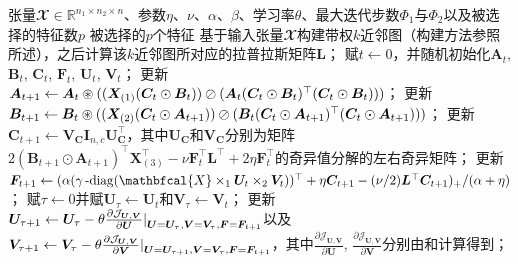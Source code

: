 \begin{algorithm}[t]
    \begin{algorithmic}[1]
    \REQUIRE 张量$\mathbfcal{X}\in \mathbb{R}^{n_{1}\times n_{2}\times n}$、参数$\eta$、$\nu$、$\alpha$、$\beta$、学习率$\theta$、最大迭代步数$\Phi_1$与$\Phi_2$以及被选择的特征数$p$
    \ENSURE 被选择的$p$个特征
    \STATE 基于输入张量$\mathbfcal{X}$构建带权$k$近邻图（构建方法参照所述），之后计算该$k$近邻图所对应的拉普拉斯矩阵$\boldsymbol{L}$；
    \STATE 赋$t\leftarrow0$，并随机初始化$\boldsymbol{A}_{t}$, $\boldsymbol{B}_{t}$, $\boldsymbol{C}_{t}$, $\boldsymbol{F}_{t}$, $\boldsymbol{U}_{t}$, $\boldsymbol{V}_{t}$；
    \STATE 更新$\boldsymbol{A}_{t+1}\leftarrow\boldsymbol{A}_{t}\oast((\boldsymbol{X}_{(1)}(\boldsymbol{C}_{t}\odot\boldsymbol{B}_{t}))\oslash(\boldsymbol{A}_{t}(\boldsymbol{C}_{t}\odot\boldsymbol{B}_{t})^{\top}(\boldsymbol{C}_{t}\odot\boldsymbol{B}_{t})))$；
    \STATE 更新$\boldsymbol{B}_{t+1}\leftarrow\boldsymbol{B}_{t}\oast((\boldsymbol{X}_{(2)}(\boldsymbol{C}_{t}\odot\boldsymbol{A}_{t+1}))\oslash(\boldsymbol{B}_{t}(\boldsymbol{C}_{t}\odot\boldsymbol{A}_{t+1})^{\top}(\boldsymbol{C}_{t}\odot\boldsymbol{A}_{t+1})))$；
    \STATE 更新$\boldsymbol{C}_{t+1} \leftarrow \boldsymbol{V}_{\boldsymbol{C}}\boldsymbol{I}_{n,c}\boldsymbol{U}_{\boldsymbol{C}}^{\top}$，其中$\boldsymbol{U}_{\boldsymbol{C}}$和$\boldsymbol{V}_{\boldsymbol{C}}$分别为矩阵$2(\boldsymbol{B}_{t+1}\odot\boldsymbol{A}_{t+1})^{\top}\allowbreak\boldsymbol{X}_{(3)}^{\top}-\nu\boldsymbol{F}_{t}^{\top}\boldsymbol{L}^{\top} + 2\eta\boldsymbol{F}_{t}^{\top}$的奇异值分解的左右奇异矩阵；
    \STATE 更新$\boldsymbol{F}_{t+1}\leftarrow(\alpha(\mydiag(\mathbfcal{X}\times_{1}\boldsymbol{U}_{t}\times_{2}\boldsymbol{V}_{t}))^{\top}+\eta\boldsymbol{C}_{t+1}-(\nu/2)\boldsymbol{L}^{\top}\boldsymbol{C}_{t+1})_{+}/(\alpha+\eta)$；\hspace{-1em}
    \STATE 赋$\tau\leftarrow 0$并赋$\boldsymbol{U}_{\tau}\leftarrow\boldsymbol{U}_{t}$和$\boldsymbol{V}_{\tau}\leftarrow\boldsymbol{V}_{t}$；
    \STATE 更新$\boldsymbol{U}_{\tau+1}\leftarrow\boldsymbol{U}_{\tau}-\theta\frac{\partial\mathcal{J}_{\boldsymbol{U},\boldsymbol{V}}}{\partial\boldsymbol{U}}\vert_{\boldsymbol{U}=\boldsymbol{U}_{\tau},\boldsymbol{V}=\boldsymbol{V}_{\tau},\boldsymbol{F}=\boldsymbol{F}_{t+1}}^{}$以及$\boldsymbol{V}_{\tau+1}\leftarrow\boldsymbol{V}_{\tau}-\theta\frac{\partial\mathcal{J}_{\boldsymbol{U},\boldsymbol{V}}}{\partial\boldsymbol{V}}\vert_{\boldsymbol{U}=\boldsymbol{U}_{\tau+1},\boldsymbol{V}=\boldsymbol{V}_{\tau},\boldsymbol{F}=\boldsymbol{F}_{t+1}}^{}$，其中$\frac{\partial\mathcal{J}_{\boldsymbol{U},\boldsymbol{V}}}{\partial\boldsymbol{U}}$, $\frac{\partial\mathcal{J}_{\boldsymbol{U},\boldsymbol{V}}}{\partial\boldsymbol{V}}$分别由和计算得到；

\end{algorithmic}
\end{algorithm}
